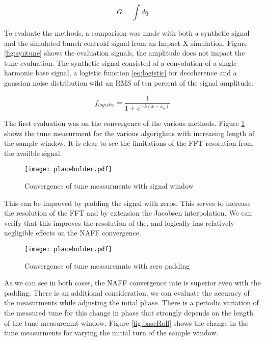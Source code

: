 \begin{equation}
	G = \int dq
	\label{eq:naff}
\end{equation}

To evaluate the methods, a comparison was made with both a synthetic signal and the simulated bunch centroid signal from an Impact-X simulation. Figure \ref{fig:syntune} shows the evaluation signals, the amplitude does not impact the tune evaluation. The synthetic signal consisted of a convolution of a single harmonic base signal, a logistic function \ref{eq:logistic} for decoherence and a gaussian noise distribution wiht an RMS of ten percent of the signal amplitude. 

\begin{equation}
	f_{logistic} = \frac{1}{1 + e^{-k(x-x_o)}}
	\label{eq:logistic}
\end{equation}

The first evaluation was on the convergence of the various methods. Figure \ref{fig:baseConv} shows the tune measurment for the various algorighms with increasing length of the sample window. It is clear to see the limitations of the FFT resolution from the availble signal. 

\begin{figure}
	\centering
	\texttt{[image: placeholder.pdf]}
	\caption{Convergence of tune measurments with signal window}
	\label{fig:baseConv}
\end{figure}

This can be improved by padding the signal with zeros. This serves to increase the resolution of the FFT and by extension the Jacobsen interpolation. We can verify that this improves the resolution of the, and logically has relatively negligible effects on the NAFF convergence.

\begin{figure}
	\centering
	\texttt{[image: placeholder.pdf]}
	\caption{Convergence of tune measuremnts with zero padding}
	\label{fig:padConv}
\end{figure}

As we can see in both cases, the NAFF convergence rate is superior even with the padding. There is an additional consideration, we can evaluate the accuracy of the measurments while adjusting the inital phase. There is a periodic variation of the measured tune for this change in phase that strongly depends on the length of the tune measuremnt window. Figure \ref{fig:baseRoll} shows the change in the tune measurments for varying the initial turn of the sample window. 


